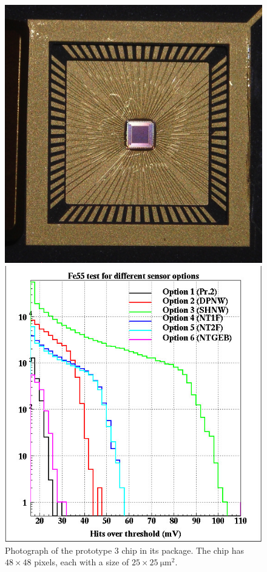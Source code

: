 \begin{figure}
    \centering
    \begin{minipage}[t]{0.35\textwidth}
        \includegraphics[width=\linewidth]{VertexDetector/Chronopix/Chronopix_image}
        \caption{Photograph of the prototype 3 chip in its package. The chip has $48\times48$ pixels, each with a size of $25\times\SI{25}{\micro\meter^2}$.}
        \label{fig:VertexDetector:ChronoPixel:image}
    \end{minipage}\quad
    \begin{minipage}[t]{0.35\textwidth}
        \includegraphics[width=\linewidth]{VertexDetector/Chronopix/Fe55tst}

\end{minipage}
\end{figure}
